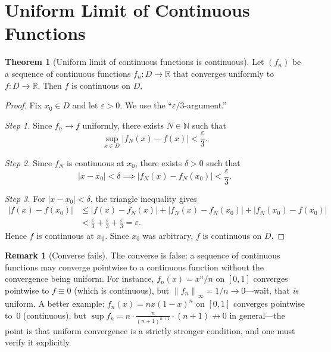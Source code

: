 \documentclass[12pt,a4paper]{book}
\theoremstyle{definition}
\newtheorem{theorem}{Theorem}[chapter]
\newtheorem{remark}{Remark}[chapter]
\newcommand{\N}{\mathbb{N}}
\newcommand{\R}{\mathbb{R}}
\newcommand{\eps}{\varepsilon}
\newcommand{\abs}[1]{\left\lvert #1 \right\rvert}
\newcommand{\norm}[1]{\left\lVert #1 \right\rVert}
\begin{document}
\section{Uniform Limit of Continuous Functions}\label{sec:uniform-cont}

\begin{theorem}[Uniform limit of continuous functions is continuous]\label{thm:unif-limit-cont}
  Let $(f_n)$ be a sequence of continuous functions $f_n\colon D\to\R$
  that converges uniformly to $f\colon D\to\R$.  Then $f$ is continuous
  on $D$.
\end{theorem}

\begin{proof}
  Fix $x_0\in D$ and let $\eps>0$.  We use the ``$\eps/3$-argument.''

  \emph{Step 1.}\;
  Since $f_n\to f$ uniformly, there exists $N\in\N$ such that
  \[
    \sup_{x\in D}\abs{f_N(x)-f(x)} < \frac{\eps}{3}.
  \]

  \emph{Step 2.}\;
  Since $f_N$ is continuous at $x_0$, there exists $\delta>0$ such that
  \[
    \abs{x-x_0}<\delta \implies \abs{f_N(x)-f_N(x_0)} < \frac{\eps}{3}.
  \]

  \emph{Step 3.}\;
  For $\abs{x-x_0}<\delta$, the triangle inequality gives
  \begin{align*}
    \abs{f(x)-f(x_0)}
    &\le \abs{f(x)-f_N(x)} + \abs{f_N(x)-f_N(x_0)} + \abs{f_N(x_0)-f(x_0)} \\
    &< \frac{\eps}{3}+\frac{\eps}{3}+\frac{\eps}{3} = \eps.
  \end{align*}
  Hence $f$ is continuous at $x_0$.  Since $x_0$ was arbitrary, $f$ is
  continuous on $D$.
\end{proof}

\begin{remark}[Converse fails]\label{rem:converse-fails}
  The converse is false: a sequence of continuous functions may converge
  pointwise to a continuous function without the convergence being
  uniform.  For instance, $f_n(x)=x^n/n$ on $[0,1]$ converges
  pointwise to $f\equiv0$ (which is continuous), but
  $\norm{f_n}_\infty=1/n\to0$---wait, that \emph{is} uniform.  A better
  example: $f_n(x)=nx(1-x)^n$ on $[0,1]$ converges pointwise to~$0$
  (continuous), but $\sup f_n=n\cdot\frac{n}{(n+1)^{n+1}}\cdot
  (n+1)\not\to0$ in general---the point is that uniform convergence is a
  strictly stronger condition, and one must verify it explicitly.
\end{remark}
\end{document}
